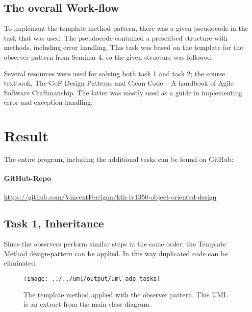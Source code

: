 \documentclass[a4paper]{scrreprt}
\begin{document}
\section*{The overall Work-flow}
To implement the template method pattern,
there was a given pseudocode in the task that was used.
The pseudocode contained a prescribed structure with methods, including error handling.
This task was based on the template for the observer pattern from Seminar 4,
so the given structure was followed.

Several resources were used for solving both task 1 and task 2; the course textbook, The GoF Design Patterns
and Clean Code -- A handbook of Agile Software Craftmanship.
The latter was mostly used as a guide in implementing error and exception handling.

\newpage
\chapter{Result}
\label{sec:result}
The entire program, including the additional tasks can be found on GitHub:

\subsubsection*{GitHub-Repo}
\url{https://github.com/VincentFerrigan/kth-iv1350-object-oriented-design}

\section*{Task 1, Inheritance}
Since the observers perform similar steps in the same order,
the Template Method design-pattern can be applied.
In this way duplicated code can be eliminated.

\begin{figure}[H]
    \begin{center}
        \texttt{[image: ../../uml/output/uml\_adp\_tasks]}
        \caption{The template method applied with the observer pattern.
        This UML is an extract from the main class diagram.\\}
        \label{fig:the-observers}
    \end{center}
\end{figure}
\end{document}

